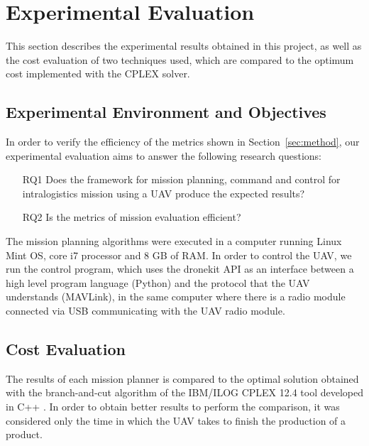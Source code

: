 \documentclass[conference,harvard,brazil,english]{sbatex}
\begin{document}
\section{Experimental Evaluation}
\label{sec:results}

This section describes the experimental results obtained in this project, as well as the cost evaluation of two techniques used, which are compared to the optimum cost implemented with the CPLEX solver.

\subsection{Experimental Environment and Objectives}
\label{ssec:expobjandenv}
In order to verify the efficiency of the metrics shown in Section~\ref{sec:method}, our experimental evaluation aims to answer the following research questions:
\begin{enumerate}

\item[RQ1] Does the framework for mission planning, command and control for intralogistics mission using a UAV produce the expected results?

\item[RQ2] Is the metrics of mission evaluation efficient?

\end{enumerate}

The mission planning algorithms were executed in a computer running Linux Mint OS, core i7 processor and 8 GB of RAM. In order to control the UAV, we run the control program, which uses the dronekit API as an interface between a high level program language (Python) and the protocol that the UAV understands (MAVLink), in the same computer where there is a radio module connected via USB communicating with the UAV radio module.


\subsection{Cost Evaluation}
\label{ssec:acusto}

The results of each mission planner is compared to the optimal solution obtained with the branch-and-cut algorithm of the IBM/ILOG CPLEX 12.4 tool developed in C++ \cite{cplex2003ilog}. In order to obtain better results to perform the comparison, it was considered only the time in which the UAV takes to finish the production of a product.
\end{document}
